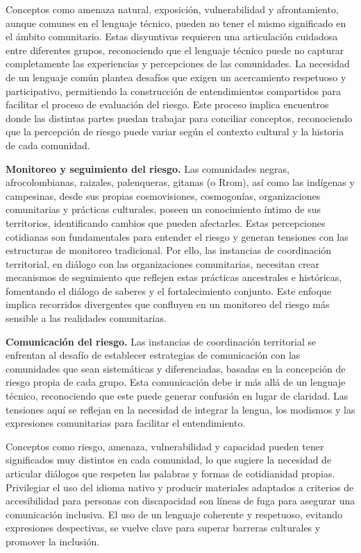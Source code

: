 \documentclass[
  spanish,
  letterpaper,
]{book}
\begin{document}
Conceptos como amenaza natural, exposición, vulnerabilidad y
afrontamiento, aunque comunes en el lenguaje técnico, pueden no tener el
mismo significado en el ámbito comunitario. Estas disyuntivas requieren
una articulación cuidadosa entre diferentes grupos, reconociendo que el
lenguaje técnico puede no capturar completamente las experiencias y
percepciones de las comunidades. La necesidad de un lenguaje común
plantea desafíos que exigen un acercamiento respetuoso y participativo,
permitiendo la construcción de entendimientos compartidos para facilitar
el proceso de evaluación del riesgo. Este proceso implica encuentros
donde las distintas partes puedan trabajar para conciliar conceptos,
reconociendo que la percepción de riesgo puede variar según el contexto
cultural y la historia de cada comunidad.

\textbf{Monitoreo y seguimiento del riesgo.} Las comunidades negras,
afrocolombianas, raizales, palenqueras, gitanas (o Rrom), así como las
indígenas y campesinas, desde sus propias cosmovisiones, cosmogonías,
organizaciones comunitarias y prácticas culturales, poseen un
conocimiento íntimo de sus territorios, identificando cambios que pueden
afectarles. Estas percepciones cotidianas son fundamentales para
entender el riesgo y generan tensiones con las estructuras de monitoreo
tradicional. Por ello, las instancias de coordinación territorial, en
diálogo con las organizaciones comunitarias, necesitan crear mecanismos
de seguimiento que reflejen estas prácticas ancestrales e históricas,
fomentando el diálogo de saberes y el fortalecimiento conjunto. Este
enfoque implica recorridos divergentes que confluyen en un monitoreo del
riesgo más sensible a las realidades comunitarias.

\textbf{Comunicación del riesgo.} Las instancias de coordinación
territorial se enfrentan al desafío de establecer estrategias de
comunicación con las comunidades que sean sistemáticas y diferenciadas,
basadas en la concepción de riesgo propia de cada grupo. Esta
comunicación debe ir más allá de un lenguaje técnico, reconociendo que
este puede generar confusión en lugar de claridad. Las tensiones aquí se
reflejan en la necesidad de integrar la lengua, los modismos y las
expresiones comunitarias para facilitar el entendimiento.

Conceptos como riesgo, amenaza, vulnerabilidad y capacidad pueden tener
significados muy distintos en cada comunidad, lo que sugiere la
necesidad de articular diálogos que respeten las palabras y formas de
cotidianidad propias. Privilegiar el uso del idioma nativo y producir
materiales adaptados a criterios de accesibilidad para personas con
discapacidad son líneas de fuga para asegurar una comunicación
inclusiva. El uso de un lenguaje coherente y respetuoso, evitando
expresiones despectivas, se vuelve clave para superar barreras
culturales y promover la inclusión.
\end{document}
